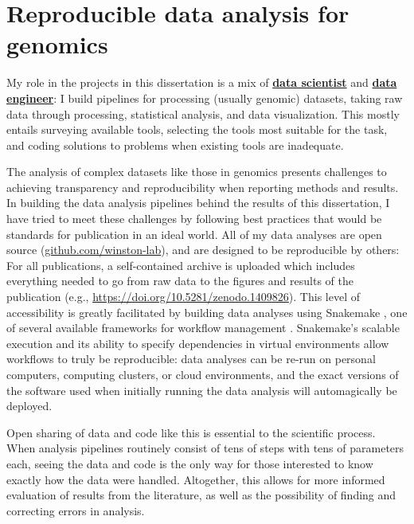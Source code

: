 \section{Reproducible data analysis for genomics}

My role in the projects in this dissertation is a mix of \href{https://blog.insightdatascience.com/data-science-vs-data-engineering-62da7678adaa}{\textbf{data scientist}} and \href{https://blog.insightdatascience.com/data-science-vs-data-engineering-62da7678adaa}{\textbf{data engineer}}: I build pipelines for processing (usually genomic) datasets, taking raw data through processing, statistical analysis, and data visualization.
This mostly entails surveying available tools, selecting the tools most suitable for the task, and coding solutions to problems when existing tools are inadequate.

The analysis of complex datasets like those in genomics presents challenges to achieving transparency and reproducibility when reporting methods and results.
In building the data analysis pipelines behind the results of this dissertation, I have tried to meet these challenges by following best practices that would be standards for publication in an ideal world.
All of my data analyses are open source (\href{https://github.com/winston-lab}{github.com/winston-lab}), and are designed to be reproducible by others: For all publications, a self-contained archive is uploaded which includes everything needed to go from raw data to the figures and results of the publication (e.g., \url{https://doi.org/10.5281/zenodo.1409826}).
This level of accessibility is greatly facilitated by building data analyses using Snakemake \citep{koster2012}, one of several available frameworks for workflow management \citep{voss2017, ditommaso2017}.
Snakemake's scalable execution and its ability to specify dependencies in virtual environments allow workflows to truly be reproducible: data analyses can be re-run on personal computers, computing clusters, or cloud environments, and the exact versions of the software used when initially running the data analysis will automagically be deployed.

Open sharing of data and code like this is essential to the scientific process.
When analysis pipelines routinely consist of tens of steps with tens of parameters each, seeing the data and code is the only way for those interested to know exactly how the data were handled.
Altogether, this allows for more informed evaluation of results from the literature, as well as the possibility of finding and correcting errors in analysis.

\clearpage

\begingroup
    \singlespacing
    
\endgroup

